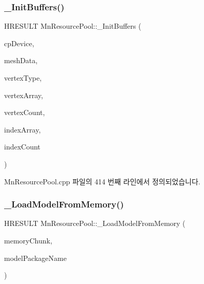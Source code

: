 \subsubsection{\texorpdfstring{\+\_\+\+Init\+Buffers()}{\_InitBuffers()}}
{\footnotesize\ttfamily H\+R\+E\+S\+U\+LT Mn\+Resource\+Pool\+::\+\_\+\+Init\+Buffers (\begin{DoxyParamCaption}\item[{const \hyperlink{namespace_m_n_l_a1eec210db8f309a4a9ac0d9658784c31}{C\+P\+D3\+D\+Device} \&}]{cp\+Device,  }\item[{std\+::shared\+\_\+ptr$<$ \hyperlink{class_m_n_l_1_1_mn_mesh_data}{Mn\+Mesh\+Data} $>$}]{mesh\+Data,  }\item[{const std\+::shared\+\_\+ptr$<$ \hyperlink{class_m_n_l_1_1_mn_custom_vertex_type}{Mn\+Custom\+Vertex\+Type} $>$ \&}]{vertex\+Type,  }\item[{const std\+::vector$<$ float $>$ \&}]{vertex\+Array,  }\item[{U\+I\+NT}]{vertex\+Count,  }\item[{const std\+::vector$<$ U\+I\+NT $>$ \&}]{index\+Array,  }\item[{U\+I\+NT}]{index\+Count }\end{DoxyParamCaption})\hspace{0.3cm}{\ttfamily [private]}}



Mn\+Resource\+Pool.\+cpp 파일의 414 번째 라인에서 정의되었습니다.

\mbox{\label{class_m_n_l_1_1_mn_resource_pool_a6ceea12d9897374afb3bccf7194e1702}} 
\subsubsection{\texorpdfstring{\+\_\+\+Load\+Model\+From\+Memory()}{\_LoadModelFromMemory()}}
{\footnotesize\ttfamily H\+R\+E\+S\+U\+LT Mn\+Resource\+Pool\+::\+\_\+\+Load\+Model\+From\+Memory (\begin{DoxyParamCaption}\item[{const \hyperlink{struct_m_n_l_1_1_mn_resource_pool_1_1___memory_chunk}{\+\_\+\+Memory\+Chunk} \&}]{memory\+Chunk,  }\item[{std\+::string}]{model\+Package\+Name }\end{DoxyParamCaption})\hspace{0.3cm}{\ttfamily [private]}}



